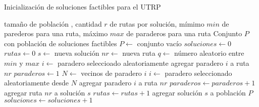 \begin{algorithm}[!htb]
\caption{Inicialización de soluciones factibles para el UTRP}
\label{alg:inicializacion}
\begin{algorithmic}[1]
\REQUIRE tamaño de población \popsize, cantidad $r$ de rutas por solución, mímimo $min$ de parederos para una ruta, máximo $max$ de paraderos para una ruta
\ENSURE Conjunto $P$ con población de soluciones factibles
\STATE $P \leftarrow$ conjunto vacío
\STATE $soluciones \leftarrow 0$ 
	\STATE $rutas \leftarrow 0$
	\STATE $s \leftarrow$ nueva solución
		\STATE $nr \leftarrow$ nueva ruta
		\STATE $q \leftarrow$ número aleatorio entre $min$ y $max$
		\STATE $i \leftarrow$ paradero seleccioado aleatoriamente
		\STATE agregar paradero $i$ a ruta $nr$
		\STATE $paraderos \leftarrow 1$
			\STATE $N \leftarrow$ vecinos de paradero $i$
			\STATE $i \leftarrow$ paradero seleccionado aleatoriamente desde $N$
			\STATE agregar paradero $i$ a ruta $nr$			
			\STATE $paraderos \leftarrow paraderos+1$
		\ENDWHILE
		\STATE agregar ruta $nr$ a solución $s$
		\STATE $rutas \leftarrow rutas + 1$
	\ENDWHILE
	\STATE agregar solución $s$ a población $P$
	\STATE $soluciones \leftarrow soluciones+1$
\ENDWHILE
\end{algorithmic}
\end{algorithm}

